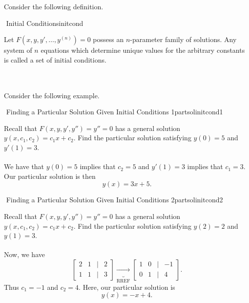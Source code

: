         Consider the following definition.
        \begin{definition}{\Stop\,\,Initial Conditions}{initcond}

            Let \(F(x,y,y',\ldots,y^{(n)})=0\) possess an \(n\)-parameter family of solutions. Any system of \(n\) equations which determine unique values for the arbitrary constants is called a set of initial conditions.
            
        \end{definition}
        \vphantom
        \\
        \\
        Consider the following example.
        \begin{example}{\Stop\,\,Finding a Particular Solution Given Initial Conditions 1}{partsolinitcond1}

            Recall that \(F(x,y,y',y'')=y''=0\) has a general solution \(y(x,c_1,c_2)=c_1x+c_2\). Find the particular solution satisfying \(y(0)=5\) and \(y'(1)=3\).
            \\
            \\
            We have that \(y(0)=5\) implies that \(c_2=5\) and \(y'(1)=3\) implies that \(c_1=3\). Our particular solution is then
            \begin{equation*}
                y(x)=3x+5.
            \end{equation*}
            
        \end{example}
        \begin{example}{\Stop\,\,Finding a Particular Solution Given Initial Conditions 2}{partsolinitcond2}

            Recall that \(F(x,y,y',y'')=y''=0\) has a general solution \(y(x,c_1,c_2)=c_1x+c_2\). Find the particular solution satisfying \(y(2)=2\) and \(y(1)=3\).
            \\
            \\
            Now, we have
            \begin{equation*}
                \begin{bmatrix}
                    2 & 1 & | & 2 \\
                    1 & 1 & | & 3
                \end{bmatrix}\underbrace{\to}_{\text{RREF}}\begin{bmatrix}
                    1 & 0 & | & -1 \\
                    0 & 1 & | & 4 
                \end{bmatrix}.
            \end{equation*}
            Thus \(c_1=-1\) and \(c_2=4\). Here, our particular solution is
            \begin{equation*}
                y(x)=-x+4.
            \end{equation*}
            
        \end{example}